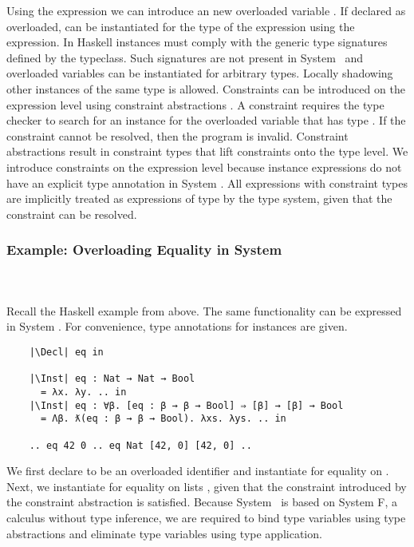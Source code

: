 \noindent Using the  expression we can introduce an new overloaded variable . 
If declared as overloaded,  can be instantiated for the type  of the expression  using the  expression.
In Haskell instances must comply with the generic type signatures defined by the typeclass. Such signatures are not present in System \Fo\ and overloaded variables can be instantiated for arbitrary types. 
Locally shadowing other instances of the same type is allowed. 
Constraints can be introduced on the expression level using constraint abstractions . A constraint  requires the type checker to search for an instance for the overloaded variable  that has type . If the constraint cannot be resolved, then the program is invalid.
Constraint abstractions result in constraint types  that lift constraints onto the type level. 
We introduce constraints on the expression level because instance expressions do not have an explicit type annotation in System \Fo.
All expressions with constraint types  are implicitly treated as expressions of type  by the type system, given that the constraint  can be resolved.

\subsubsection{Example: Overloading Equality in System \Fo}\hfill\\\\
Recall the Haskell example from above. 
The same functionality can be expressed in System \Fo. 
For convenience, type annotations for instances are given.
\newpage
\begin{verbatim}
    |\Decl| eq in

    |\Inst| eq : Nat → Nat → Bool 
      = λx. λy. .. in
    |\Inst| eq : ∀β. [eq : β → β → Bool] ⇒ [β] → [β] → Bool 
      = Λβ. ƛ(eq : β → β → Bool). λxs. λys. .. in

    .. eq 42 0 .. eq Nat [42, 0] [42, 0] .. 
\end{verbatim} 
We first declare  to be an overloaded identifier and instantiate  for equality on . 
Next, we instantiate  for equality on lists \inl{[β]}, given that the constraint  introduced by the constraint abstraction is satisfied. 
Because System \Fo\ is based on System F, a calculus without type inference, we are required to bind type variables using type abstractions  and eliminate type variables using type application. 

